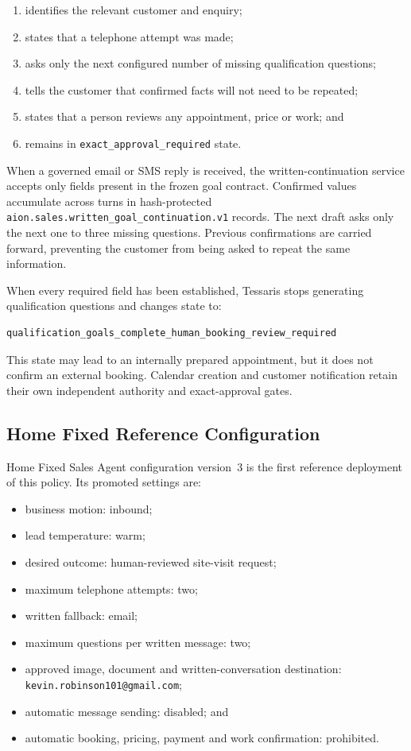 \begin{enumerate}[leftmargin=*]
  \item identifies the relevant customer and enquiry;
  \item states that a telephone attempt was made;
  \item asks only the next configured number of missing qualification questions;
  \item tells the customer that confirmed facts will not need to be repeated;
  \item states that a person reviews any appointment, price or work; and
  \item remains in \texttt{exact\_approval\_required} state.
\end{enumerate}

When a governed email or SMS reply is received, the written-continuation service
accepts only fields present in the frozen goal contract.  Confirmed values
accumulate across turns in hash-protected
\texttt{aion.sales.written\_goal\_continuation.v1} records.  The next draft asks
only the next one to three missing questions.  Previous confirmations are
carried forward, preventing the customer from being asked to repeat the same
information.

When every required field has been established, Tessaris stops generating
qualification questions and changes state to:

\begin{verbatim}
qualification_goals_complete_human_booking_review_required
\end{verbatim}

This state may lead to an internally prepared appointment, but it does not
confirm an external booking.  Calendar creation and customer notification retain
their own independent authority and exact-approval gates.

\subsection{Home Fixed Reference Configuration}

Home Fixed Sales Agent configuration version~3 is the first reference deployment
of this policy.  Its promoted settings are:

\begin{itemize}[leftmargin=*]
  \item business motion: inbound;
  \item lead temperature: warm;
  \item desired outcome: human-reviewed site-visit request;
  \item maximum telephone attempts: two;
  \item written fallback: email;
  \item maximum questions per written message: two;
  \item approved image, document and written-conversation destination:
        \texttt{kevin.robinson101@gmail.com};
  \item automatic message sending: disabled; and
  \item automatic booking, pricing, payment and work confirmation: prohibited.
\end{itemize}

